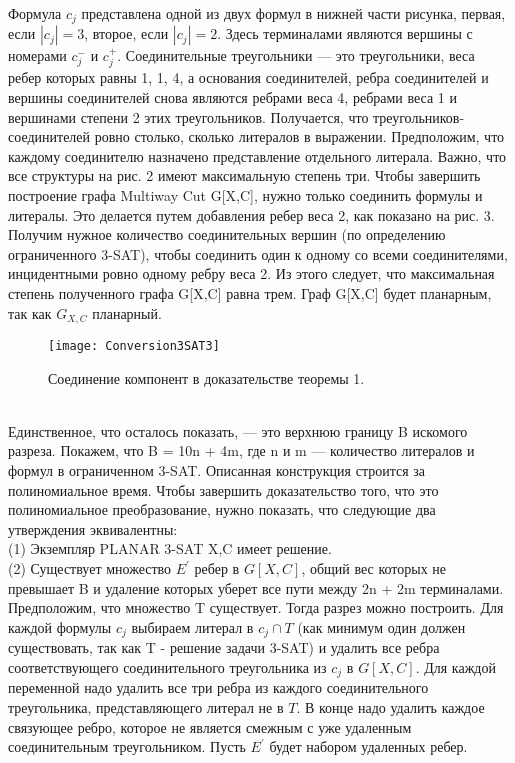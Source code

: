 \\Формула \(c_j\) представлена одной из двух формул в нижней части рисунка, первая, если
\(|c_j| = 3\), второе, если \(|c_j| = 2\). Здесь терминалами являются вершины с номерами \(c_j^-\)
и \(c_j^+\). Соединительные треугольники — это треугольники, веса ребер которых равны 1, 1, 4, а основания соединителей, ребра соединителей и вершины соединителей снова являются ребрами веса 4, ребрами веса 1 и вершинами степени 2 этих треугольников. Получается, что треугольников-соединителей ровно столько, сколько литералов в выражении. Предположим, что каждому соединителю назначено представление отдельного литерала.
Важно, что все структуры на рис. 2 имеют максимальную степень три. Чтобы завершить построение графа Multiway Cut G[X,C], нужно только соединить формулы и литералы. Это делается путем добавления ребер веса 2, как показано на рис. 3. Получим нужное количество соединительных вершин (по определению ограниченного 3-SAT), чтобы соединить один к одному со всеми соединителями, инцидентными ровно одному ребру веса 2. Из этого следует, что максимальная степень полученного графа G[X,C] равна трем. Граф G[X,C] будет планарным, так как \(G_{X,C}\) планарный.
\begin{figure}[hbt!]
\centering
    \texttt{[image: Conversion3SAT3]}
    \caption{Соединение компонент в доказательстве теоремы 1.}
\end{figure}
\\Единственное, что осталось показать, — это верхнюю границу B искомого разреза. Покажем, что B = 10n + 4m, где n и m — количество литералов и формул в ограниченном 3-SAT. Описанная конструкция строится за полиномиальное время. Чтобы завершить доказательство того, что это полиномиальное преобразование, нужно показать, что следующие два утверждения эквивалентны:
\\(1) Экземпляр PLANAR 3-SAT X,C имеет решение.
\\(2) Существует множество \(E^'\) ребер в \(G[X,C]\), общий вес которых не превышает B и удаление которых
уберет все пути между 2n + 2m терминалами.
Предположим, что множество T существует. Тогда разрез можно построить. Для каждой формулы \(c_j\) выбираем литерал в \(c_j \cap T\) (как минимум один должен существовать, так как T - решение задачи 3-SAT) и удалить все ребра соответствующего соединительного треугольника из \(c_j\) в \(G[X,C]\). Для каждой переменной надо удалить все три ребра из каждого соединительного треугольника, представляющего литерал не в \(T\). В конце надо удалить каждое связующее ребро, которое не является смежным с уже удаленным соединительным треугольником. Пусть \(E^'\) будет набором удаленных ребер.
